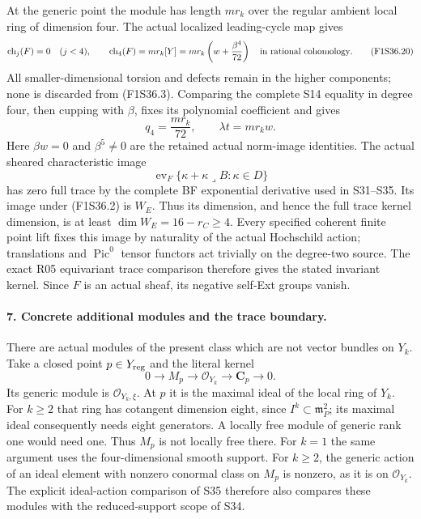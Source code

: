 At the generic point the module has length
$m r_k$ over the regular ambient local ring
of dimension four. The actual localized
leading-cycle map gives
\[
 \operatorname{ch}_j(F)=0\quad(j<4),\qquad
 \operatorname{ch}_4(F)
             =m r_k[Y]=m r_k\left(w+\frac{\beta^4}{72}\right)
                   \quad\hbox{in rational cohomology}.
 \tag{F1S36.20}
\]
All smaller-dimensional torsion and defects
remain in the higher components; none is
discarded from (F1S36.3).
Comparing the complete S14 equality in degree
four, then cupping with $\beta$, fixes its
polynomial coefficient and gives
\[
              q_4=\frac{m r_k}{72},\qquad
                         \lambda t=m r_k w.
 \tag{F1S36.21}
\]
Here $\beta w=0$ and $\beta^5\ne0$ are the
retained actual norm-image identities.
The actual sheared characteristic image
\[
 \operatorname{ev}_F
       \{\kappa+\kappa\mathbin{\lrcorner}B:\kappa\in D\}
 \tag{F1S36.22}
\]
has zero full trace by the complete BF
exponential derivative used in S31--S35.
Its image under (F1S36.2) is $W_E$.
Thus its dimension, and hence the full trace
kernel dimension, is at least
$\dim W_E=16-r_C\ge4$.
Every specified coherent finite point lift
fixes this image by naturality of the actual
Hochschild action; translations and
$\operatorname{Pic}^0$ tensor functors act
trivially on the degree-two source.
The exact R05 equivariant trace comparison
therefore gives the stated invariant kernel.
Since $F$ is an actual sheaf, its negative
self-Ext groups vanish.

\paragraph{7. Concrete additional modules and the trace boundary.}
There are actual modules of the present class
which are not vector bundles on $Y_k$.
Take a closed point $p\in Y_{\rm reg}$ and the
literal kernel
\[
        0\longrightarrow M_p\longrightarrow
              \mathcal O_{Y_k}\longrightarrow\mathbf C_p
                                      \longrightarrow0.
 \tag{F1S36.23}
\]
Its generic module is $\mathcal O_{Y_k,\xi}$.
At $p$ it is the maximal ideal of the local
ring of $Y_k$. For $k\ge2$ that ring has
cotangent dimension eight, since
$I^k\subset\mathfrak m_P^2$; its maximal
ideal consequently needs eight generators.
A locally free module of generic rank one
would need one. Thus $M_p$ is not locally
free there. For $k=1$ the same argument uses
the four-dimensional smooth support.
For $k\ge2$, the generic action of an ideal
element with nonzero conormal class on $M_p$
is nonzero, as it is on $\mathcal O_{Y_k}$.
The explicit ideal-action comparison of S35
therefore also compares these modules with
the reduced-support scope of S34.

